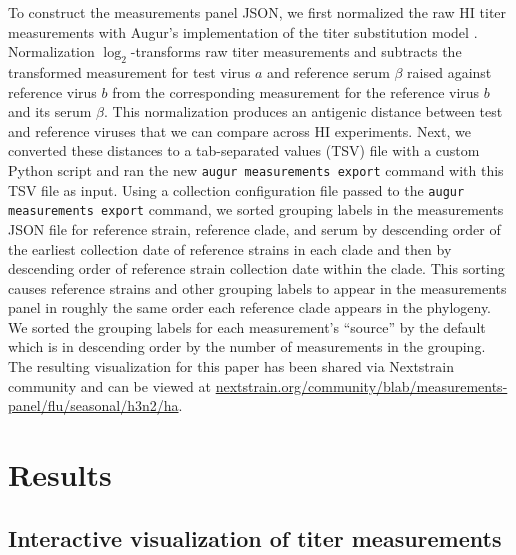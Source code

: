 \documentclass[utf8]{FrontiersinHarvard} %
\begin{document}
To construct the measurements panel JSON, we first normalized the raw HI titer measurements with Augur's implementation of the titer substitution model \citep{Neher:2016hy}.
Normalization $\log_{2}$-transforms raw titer measurements and subtracts the transformed measurement for test virus $a$ and reference serum $\beta$ raised against reference virus $b$ from the corresponding measurement for the reference virus $b$ and its serum $\beta$.
This normalization produces an antigenic distance between test and reference viruses that we can compare across HI experiments.
Next, we converted these distances to a tab-separated values (TSV) file with a custom Python script and ran the new \texttt{augur measurements export} command with this TSV file as input.
Using a collection configuration file passed to the \texttt{augur measurements export} command, we sorted grouping labels in the measurements JSON file for reference strain, reference clade, and serum by descending order of the earliest collection date of reference strains in each clade and then by descending order of reference strain collection date within the clade.
This sorting causes reference strains and other grouping labels to appear in the measurements panel in roughly the same order each reference clade appears in the phylogeny.
We sorted the grouping labels for each measurement's ``source'' by the default which is in descending order by the number of measurements in the grouping.
The resulting visualization for this paper has been shared via Nextstrain community and can be viewed at \href{https://nextstrain.org/community/blab/measurements-panel/flu/seasonal/h3n2/ha}{nextstrain.org/community/blab/measurements-panel/flu/seasonal/h3n2/ha}.

\section{Results}

\subsection{Interactive visualization of titer measurements}
\end{document}
